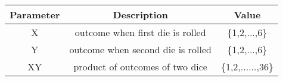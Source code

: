 \begin{tabular}{|c|c|c|}
\hline
Parameter	&Description	&Value\\
\hline
       X	&outcome when first die is rolled	&\{1,2,...,6\}\\
       \hline
       Y	&outcome when second die is rolled	&\{1,2,...,6\}\\
       \hline
       XY	&product of outcomes of two dice	&\{1,2,......,36\}\\
       \hline
       \end{tabular}
